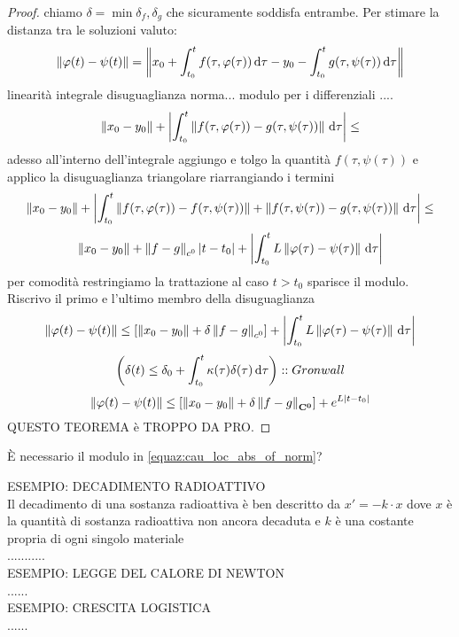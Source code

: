 \begin{proof}
	chiamo $\delta=\min{\delta_f,\delta_g}$ che sicuramente soddisfa entrambe. Per stimare la distanza tra le soluzioni valuto:
	$$
	\left\|\varphi(t)-\psi(t)\right\|=
	\left\| x_0+\int_{t_0}^t f(\tau,\varphi(\tau))\,\mathrm{d}{\tau} - y_0 - \int_{t_0}^t g(\tau,\psi(\tau))\,\mathrm{d}{\tau}\right\|
	$$
	linearità integrale disuguaglianza norma... modulo per i differenziali ....\\
	$$ \left\|x_0-y_0\right\|+\left|\int_{t_0}^{t} \left\|f(\tau,\varphi(\tau))-g(\tau,\psi(\tau))\right\|\,\mathrm{d}{\tau}\right|\le$$
	adesso all'interno dell'integrale aggiungo e tolgo la quantità $f(\tau,\psi(\tau))$ e applico la disuguaglianza triangolare riarrangiando i termini
	$$ \left\|x_0-y_0\right\|+\left|\int_{t_0}^{t} \left\|f(\tau,\varphi(\tau))-f(\tau,\psi(\tau))\right\|+\left\|f(\tau,\psi(\tau))-g(\tau,\psi(\tau))\right\|\,\mathrm{d}{\tau}\right|\le$$
	$$ \left\|x_0-y_0\right\| + \left\|f-g\right\|_{c^0}\left|t-t_0\right| +\left|\int_{t_0}^{t} L\left\|\varphi(\tau)-\psi(\tau)\right\| \,\mathrm{d}{\tau}\right|$$
	per comodità restringiamo la trattazione al caso $t>t_0$ sparisce il modulo. Riscrivo il primo e l'ultimo membro della disuguaglianza
	$$ \left\|\varphi(t)-\psi(t)\right\|\le  \left[ \left\|x_0-y_0\right\| + \delta\left\|f-g\right\|_{c^0}\right] +\left|\int_{t_0}^{t} L\left\|\varphi(\tau)-\psi(\tau)\right\| \,\mathrm{d}{\tau}\right|$$
	$$ \left( \delta(t)\le\delta_0+\int_{t_0}^t \kappa(\tau)\delta(\tau)\,\mathrm{d}{\tau} \right)::Gronwall$$
	$$ \left\|\varphi(t)-\psi(t)\right\|\le\left[\left\|x_0-y_0\right\|+\delta\left\|f-g\right\|_{\mathbf{C^{0}}}\right]+e^{L\left|t-t_0\right|}$$
	QUESTO TEOREMA è TROPPO DA PRO.
\end{proof}
\begin{exercise}
	È necessario il modulo in \eqref{equaz:cau_loc_abs_of_norm}? %
\end{exercise}
ESEMPIO: DECADIMENTO RADIOATTIVO\\
Il decadimento di una sostanza radioattiva è ben descritto da $ x'=-k\cdot x$ dove $x$ è la quantità di sostanza radioattiva non ancora decaduta e $k$ è una costante propria di ogni singolo materiale\\
...........\\
ESEMPIO: LEGGE DEL CALORE DI NEWTON\\
......\\
ESEMPIO: CRESCITA LOGISTICA\\
......\\
